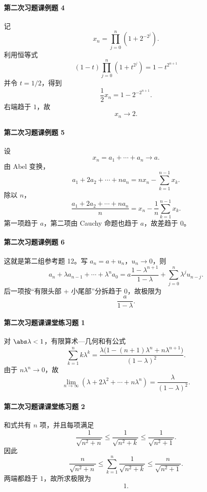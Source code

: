 \paragraph{第二次习题课例题 4}
\begin{xsolution}
记
\[
  x_n=\prod_{j=0}^n\left(1+2^{-2^j}\right).
\]
利用恒等式
\[
  (1-t)\prod_{j=0}^n(1+t^{2^j})=1-t^{2^{n+1}}
\]
并令 $t=1/2$，得到
\[
  \frac12x_n=1-2^{-2^{n+1}}.
\]
右端趋于 $1$，故
\[
  \boxed{x_n\to2}.
\]
\end{xsolution}

\paragraph{第二次习题课例题 5}
\begin{xsolution}
设
\[
  x_n=a_1+\cdots+a_n\to a.
\]
由 Abel 变换，
\[
  a_1+2a_2+\cdots+na_n
  =nx_n-\sum_{k=1}^{n-1}x_k.
\]
除以 $n$，
\[
  \frac{a_1+2a_2+\cdots+na_n}{n}
  =x_n-\frac1n\sum_{k=1}^{n-1}x_k.
\]
第一项趋于 $a$，第二项由 Cauchy 命题也趋于 $a$，故差趋于 $0$。
\end{xsolution}

\paragraph{第二次习题课例题 6}
\begin{xsolution}
这就是第二组参考题 12。写 $a_n=a+u_n$，$u_n\to0$，则
\[
  a_n+\lambda a_{n-1}+\cdots+\lambda^na_0
  =a\frac{1-\lambda^{n+1}}{1-\lambda}
  +\sum_{j=0}^n\lambda^ju_{n-j}.
\]
后一项按“有限头部 + 小尾部”分拆趋于 $0$，故极限为
\[
  \boxed{\frac a{1-\lambda}}.
\]
\end{xsolution}

\paragraph{第二次习题课课堂练习题 1}
\begin{xsolution}
对 $\abs\lambda<1$，有限算术—几何和有公式
\[
  \sum_{k=1}^n k\lambda^k
  =\frac{\lambda\bigl(1-(n+1)\lambda^n+n\lambda^{n+1}\bigr)}{(1-\lambda)^2}.
\]
由于 $n\lambda^n\to0$，故
\[
  \boxed{\lim_{n\to\infty}(\lambda+2\lambda^2+\cdots+n\lambda^n)
  =\frac\lambda{(1-\lambda)^2}}.
\]
\end{xsolution}

\paragraph{第二次习题课课堂练习题 2}
\begin{xsolution}
和式共有 $n$ 项，并且每项满足
\[
  \frac1{\sqrt{n^2+n}}
  \le\frac1{\sqrt{n^2+k}}
  \le\frac1{\sqrt{n^2+1}}.
\]
因此
\[
  \frac n{\sqrt{n^2+n}}
  \le\sum_{k=1}^n\frac1{\sqrt{n^2+k}}
  \le\frac n{\sqrt{n^2+1}}.
\]
两端都趋于 $1$，故所求极限为
\[
  \boxed{1}.
\]
\end{xsolution}


